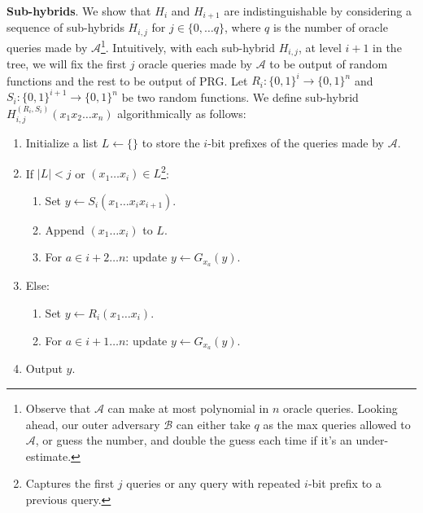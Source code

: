 \noindent \textbf{Sub-hybrids}. We show that $H_{i}$ and $H_{i+1}$ are indistinguishable by considering a sequence of sub-hybrids $H_{i,j}$ for $j \in \{0,\ldots q\}$, where $q$ is the number of oracle queries made by $\mathcal{A}$\footnote{Observe that $\mathcal{A}$ can make at most polynomial in $n$ oracle queries. Looking ahead, our outer adversary $\mathcal{B}$ can either take $q$ as the max queries allowed to $\mathcal{A}$, or guess the number, and double the guess each time if it's an under-estimate.}.
Intuitively, with each sub-hybrid $H_{i,j}$, at level $i+1$ in the tree, we will fix the first $j$ oracle queries made by $\mathcal{A}$ to be output of random functions and the rest to be output of PRG. Let $R_i: \{0, 1\}^i \to \{0, 1\}^n$ and $S_{i}: \{0, 1\}^{i+1} \to \{0, 1\}^n$ be two random functions.
We define sub-hybrid $H_{i,j}^{(R_i, S_{i})}(x_1x_2\dots x_n)$ algorithmically as follows:
\begin{enumerate}
    \item Initialize a list $L \gets \{\}$ to store the $i$-bit prefixes of the queries made by $\mathcal{A}$.
    \item If $|L| < j$ or $(x_1\dots x_i) \in L$\footnote{Captures the first $j$ queries or any query with repeated $i$-bit prefix to a previous query.}:
          \begin{enumerate}
              \item Set $y \gets S_i(x_1\dots x_i x_{i+1})$.
              \item Append $(x_1\dots x_i)$ to $L$.
              \item For $a \in i+2 \dots n$: update $y \gets G_{x_a}(y)$.
          \end{enumerate}
    \item Else:
          \begin{enumerate}
              \item Set $y \gets R_i(x_1\dots x_i)$.
              \item For $a \in i+1 \dots n$: update $y \gets G_{x_a}(y)$.
          \end{enumerate}
    \item Output $y$.
\end{enumerate}

